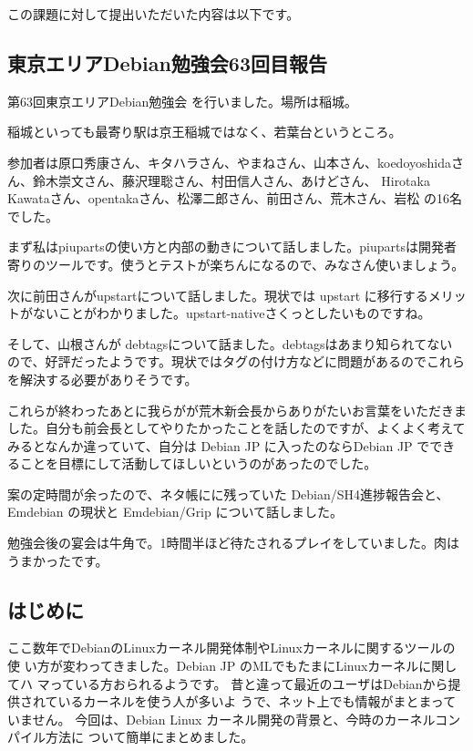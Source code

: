\documentclass[mingoth,a4paper]{jsarticle}
\begin{document}
この課題に対して提出いただいた内容は以下です。



\subsection{東京エリアDebian勉強会63回目報告}

第63回東京エリアDebian勉強会 を行いました。場所は稲城。

稲城といっても最寄り駅は京王稲城ではなく、若葉台というところ。

参加者は原口秀康さん、キタハラさん、やまねさん、山本さん、koedoyoshidaさ
ん、鈴木崇文さん、藤沢理聡さん、村田信人さん、あけどさん、 Hirotaka
Kawataさん、opentakaさん、松澤二郎さん、前田さん、荒木さん、岩松 の16名
でした。

まず私はpiupartsの使い方と内部の動きについて話しました。piupartsは開発者
寄りのツールです。使うとテストが楽ちんになるので、みなさん使いましょう。

次に前田さんがupstartについて話しました。現状では upstart に移行するメリッ
トがないことがわかりました。upstart-nativeさくっとしたいものですね。

そして、山根さんが debtagsについて話ました。debtagsはあまり知られてない
ので、好評だったようです。現状ではタグの付け方などに問題があるのでこれら
を解決する必要がありそうです。

これらが終わったあとに我らがが荒木新会長からありがたいお言葉をいただきま
した。自分も前会長としてやりたかったことを話したのですが、よくよく考えて
みるとなんか違っていて、自分は Debian JP に入ったのならDebian JP ででき
ることを目標にして活動してほしいというのがあったのでした。

案の定時間が余ったので、ネタ帳にに残っていた Debian/SH4進捗報告会と、
Emdebian の現状と Emdebian/Grip について話しました。

勉強会後の宴会は牛角で。1時間半ほど待たされるプレイをしていました。肉は
うまかったです。

\clearpage


\subsection{はじめに}

ここ数年でDebianのLinuxカーネル開発体制やLinuxカーネルに関するツールの使
い方が変わってきました。Debian JP のMLでもたまにLinuxカーネルに関してハ
マっている方おられるようです。
昔と違って最近のユーザはDebianから提供されているカーネルを使う人が多いよ
うで、ネット上でも情報がまとまっていません。
今回は、Debian Linux カーネル開発の背景と、今時のカーネルコンパイル方法に
ついて簡単にまとめました。
\end{document}
